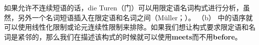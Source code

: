 \zl
如果允许不连续短语的话，die Turen（门）可以用限定语名词构式进行分析，虽然，另外一个名词短语插入在限定语和名词之间（Müller\citeyear[]{Mueller99a}；\citeyear{Mueller99f}）。 （b） 中的语序就可以使用线性化限制或论元连续性限制来排除。如果我们想让构式要求限定语和名词是紧邻的，那么我们在描述该构式的时候就可以使用\textbf{meets}而不用\textbf{before}。

